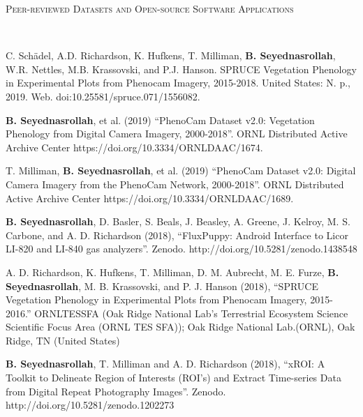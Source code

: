 \documentclass[10pt]{article}
\newenvironment{changemargin}[2]{%
  \begin{list}{}{%
 \setlength{\topsep}{0pt}%
 \setlength{\leftmargin}{#1}%
 \setlength{\rightmargin}{#2}%
 \setlength{\listparindent}{\parindent}%
 \setlength{\itemindent}{\parindent}%
 \setlength{\parsep}{\parskip}%
  }%
  \item[]}{\end{list}
}
\newcommand{\lineover}{
  \begin{changemargin}{-0.05in}{-0.05in}
  \vspace*{-8pt}
  \hrulefill \\
  \vspace*{-2pt}
  \end{changemargin}
}
\newcommand{\header}[1]{
  \begin{changemargin}{-0.5in}{-0.5in}
  \scshape{#1}\\
  \lineover
  \end{changemargin}
}
\newenvironment{body} {
  \vspace*{-2pt}
  \begin{changemargin}{-0.5in}{-0.5in}
}
{\end{changemargin}
}
\begin{document}
\medskip



\header{Peer-reviewed Datasets and Open-source Software Applications}

\begin{body}
  \begin{etaremune}
  
\item  C. Schädel, A.D. Richardson, K. Hufkens, T. Milliman, \textbf{B. Seyednasrollah},  W.R. Nettles, M.B. Krassovski, and P.J. Hanson. SPRUCE Vegetation Phenology in Experimental Plots from Phenocam Imagery, 2015-2018. United States: N. p., 2019. Web. doi:10.25581/spruce.071/1556082.\\
    \medskip


    \item  \textbf{B. Seyednasrollah}, et al. (2019) ``PhenoCam Dataset v2.0: Vegetation Phenology from Digital Camera Imagery, 2000-2018''.  ORNL Distributed Active Archive Center https://doi.org/10.3334/ORNLDAAC/1674. \\
    \medskip

    \item T. Milliman, \textbf{B. Seyednasrollah}, et al. (2019) ``PhenoCam Dataset v2.0: Digital Camera Imagery from the PhenoCam Network, 2000-2018''. ORNL Distributed Active Archive Center https://doi.org/10.3334/ORNLDAAC/1689. \\
    \medskip

    \item \textbf{B. Seyednasrollah}, D. Basler, S. Beals, J. Beasley, A. Greene, J. Kelroy, M. S. Carbone, and A. D. Richardson (2018), ``FluxPuppy: Android Interface to Licor LI-820 and LI-840 gas analyzers''. Zenodo. http://doi.org/10.5281/zenodo.1438548\\
    \medskip

    \item A. D. Richardson, K. Hufkens, T. Milliman, D. M. Aubrecht, M. E. Furze, \textbf{B. Seyednasrollah}, M. B. Krassovski, and P. J. Hanson (2018), ``SPRUCE Vegetation Phenology in Experimental Plots from Phenocam Imagery, 2015-2016.'' ORNLTESSFA (Oak Ridge National Lab's Terrestrial Ecosystem Science Scientific Focus Area (ORNL TES SFA)); Oak Ridge National Lab.(ORNL), Oak Ridge, TN (United States)\\
    \medskip

    \item \textbf{B. Seyednasrollah}, T. Milliman and A. D. Richardson (2018),  ``xROI: A Toolkit to Delineate Region of Interests (ROI's) and Extract Time-series Data from Digital Repeat Photography Images''. Zenodo. http://doi.org/10.5281/zenodo.1202273\\
    \medskip


\end{etaremune}
\end{body}
\end{document}
